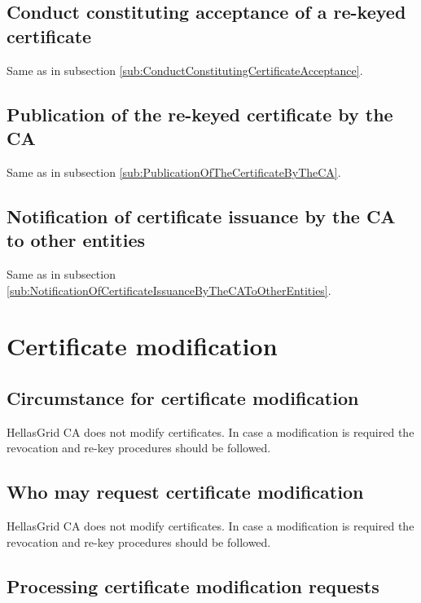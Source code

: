 \subsection{Conduct constituting acceptance of a re-keyed certificate}

Same as in subsection \ref{sub:ConductConstitutingCertificateAcceptance}. 

\subsection{Publication of the re-keyed certificate by the CA}

Same as in subsection \ref{sub:PublicationOfTheCertificateByTheCA}. 

\subsection{Notification of certificate issuance by the CA to other entities}

Same as in subsection \ref{sub:NotificationOfCertificateIssuanceByTheCAToOtherEntities}. 

\section{Certificate modification}



\subsection{Circumstance for certificate modification}
\label{sub:CircumstanceForCertificateModification}

HellasGrid CA does not modify certificates. In case a modification is required the revocation and re-key procedures should be followed. 

\subsection{Who may request certificate modification}

HellasGrid CA does not modify certificates. In case a modification is required the revocation and re-key procedures should be followed.
 
\subsection{Processing certificate modification requests}

